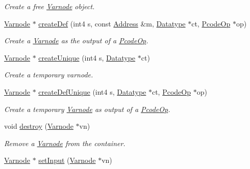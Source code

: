 \begin{DoxyCompactItemize}
\begin{DoxyCompactList}\small\item\em Create a {\itshape free} \mbox{\hyperlink{class_varnode}{Varnode}} object. \end{DoxyCompactList}\item 
\mbox{\hyperlink{class_varnode}{Varnode}} $\ast$ \mbox{\hyperlink{class_varnode_bank_a8acd91c7c2d886e404e531996f7962eb}{create\+Def}} (int4 s, const \mbox{\hyperlink{class_address}{Address}} \&m, \mbox{\hyperlink{class_datatype}{Datatype}} $\ast$ct, \mbox{\hyperlink{class_pcode_op}{Pcode\+Op}} $\ast$op)
\begin{DoxyCompactList}\small\item\em Create a \mbox{\hyperlink{class_varnode}{Varnode}} as the output of a \mbox{\hyperlink{class_pcode_op}{Pcode\+Op}}. \end{DoxyCompactList}\item 
\mbox{\hyperlink{class_varnode}{Varnode}} $\ast$ \mbox{\hyperlink{class_varnode_bank_ab73cb940a84d7cb07870f4cb50c66fb1}{create\+Unique}} (int4 s, \mbox{\hyperlink{class_datatype}{Datatype}} $\ast$ct)
\begin{DoxyCompactList}\small\item\em Create a temporary varnode. \end{DoxyCompactList}\item 
\mbox{\hyperlink{class_varnode}{Varnode}} $\ast$ \mbox{\hyperlink{class_varnode_bank_a9b47054374533bec02c4b467b390b6ca}{create\+Def\+Unique}} (int4 s, \mbox{\hyperlink{class_datatype}{Datatype}} $\ast$ct, \mbox{\hyperlink{class_pcode_op}{Pcode\+Op}} $\ast$op)
\begin{DoxyCompactList}\small\item\em Create a temporary \mbox{\hyperlink{class_varnode}{Varnode}} as output of a \mbox{\hyperlink{class_pcode_op}{Pcode\+Op}}. \end{DoxyCompactList}\item 
void \mbox{\hyperlink{class_varnode_bank_abec625ab3cf6d593cf8edc7955e5a414}{destroy}} (\mbox{\hyperlink{class_varnode}{Varnode}} $\ast$vn)
\begin{DoxyCompactList}\small\item\em Remove a \mbox{\hyperlink{class_varnode}{Varnode}} from the container. \end{DoxyCompactList}\item 
\mbox{\hyperlink{class_varnode}{Varnode}} $\ast$ \mbox{\hyperlink{class_varnode_bank_a132b64906ef393d34a4363ff816e4ba2}{set\+Input}} (\mbox{\hyperlink{class_varnode}{Varnode}} $\ast$vn)

\end{DoxyCompactItemize}
